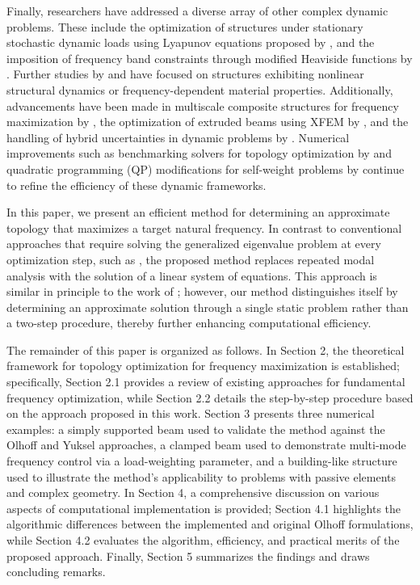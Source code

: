 \documentclass[pdflatex,lineno,sn-mathphys-ay]{sn-jnl}
\begin{document}
Finally, researchers have addressed a diverse array of other complex dynamic problems. These include the optimization of structures under stationary stochastic dynamic loads using Lyapunov equations proposed by \citet{Gomez2019}, and the imposition of frequency band constraints through modified Heaviside functions by \citet{Li2021}. Further studies by \citet{Wu2024} and \citet{Pozzi2025} have focused on structures exhibiting nonlinear structural dynamics or frequency-dependent material properties. Additionally, advancements have been made in multiscale composite structures for frequency maximization by \citet{Lee2024}, the optimization of extruded beams using XFEM by \citet{Marzok2024}, and the handling of hybrid uncertainties in dynamic problems by \citet{Wu2022}. Numerical improvements such as benchmarking solvers for topology optimization by \citet{RojasLabanda2015} and quadratic programming (QP) modifications for self-weight problems by \citet{Munro2024} continue to refine the efficiency of these dynamic frameworks.

In this paper, we present an efficient method for determining an approximate topology that maximizes a target natural frequency. In contrast to conventional approaches that require solving the generalized eigenvalue problem at every optimization step, such as \citet{Du2007}, the proposed method replaces repeated modal analysis with the solution of a linear system of equations. This approach is similar in principle to the work of \citet{Yuksel2025}; however, our method distinguishes itself by determining an approximate solution through a single static problem rather than a two-step procedure, thereby further enhancing computational efficiency.

The remainder of this paper is organized as follows. In Section 2, the theoretical framework for topology optimization for frequency maximization is established; specifically, Section 2.1 provides a review of existing approaches for fundamental frequency optimization, while Section 2.2 details the step-by-step procedure based on the approach proposed in this work. Section 3 presents three numerical examples: a simply supported beam used to validate the method against the Olhoff and Yuksel approaches, a clamped beam used to demonstrate multi-mode frequency control via a load-weighting parameter, and a building-like structure used to illustrate the method's applicability to problems with passive elements and complex geometry. In Section 4, a comprehensive discussion on various aspects of computational implementation is provided; Section 4.1 highlights the algorithmic differences between the implemented and original Olhoff formulations, while Section 4.2 evaluates the algorithm, efficiency, and practical merits of the proposed approach. Finally, Section 5 summarizes the findings and draws concluding remarks.
\end{document}
